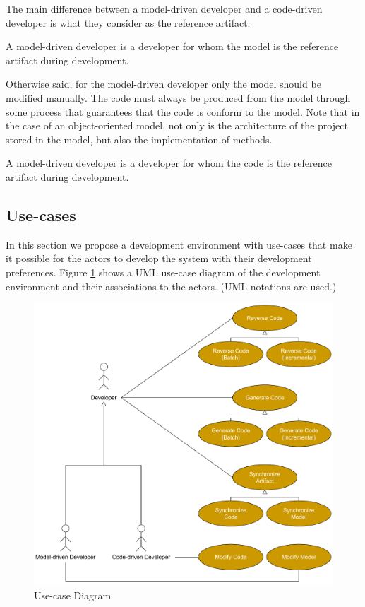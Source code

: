 The main difference between a model-driven developer and a code-driven developer
is what they consider as the reference artifact.

\begin{definition}
A model-driven developer is a developer for whom the model is the reference artifact
during development.
\end{definition}

Otherwise said, for the model-driven developer only the model should be modified manually. The
code must always be produced from the model through some process that guarantees that the
code is conform to the model. Note that in the case of an object-oriented model, not only
is the architecture of the project stored in the model, but also the implementation of
methods.

\begin{definition}
A model-driven developer is a developer for whom the code is the reference artifact
during development.
\end{definition}

\subsection{Use-cases}

In this section we propose a development environment with
use-cases that make it possible for the actors to develop
the system with their development preferences.
Figure \ref{fig:use-case} shows a UML use-case diagram of the development environment
and their associations to the actors. (UML notations are used.)

\begin{figure}
\centering
\includegraphics[width=\columnwidth]{figures/use-case}
\caption{Use-case Diagram} 
\label{fig:use-case}
\end{figure}

